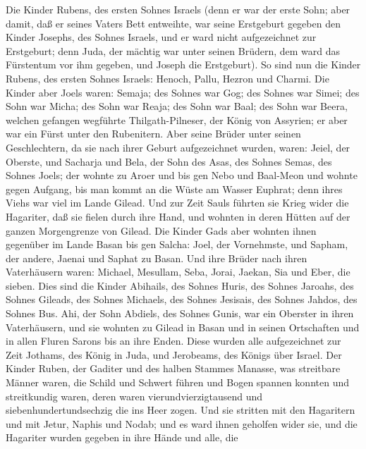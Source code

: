  Die Kinder Rubens, des ersten Sohnes Israels (denn er war
der erste Sohn; aber damit, daß er seines Vaters Bett entweihte, war
seine Erstgeburt gegeben den Kinder Josephs, des Sohnes Israels, und er
ward nicht aufgezeichnet zur Erstgeburt;  denn Juda, der
mächtig war unter seinen Brüdern, dem ward das Fürstentum vor ihm
gegeben, und Joseph die Erstgeburt).  So sind nun die Kinder
Rubens, des ersten Sohnes Israels: Henoch, Pallu, Hezron und Charmi.
 Die Kinder aber Joels waren: Semaja; des Sohnes war Gog;
des Sohnes war Simei;  des Sohn war Micha; des Sohn war
Reaja; des Sohn war Baal;  des Sohn war Beera, welchen
gefangen wegführte Thilgath-Pilneser, der König von Assyrien; er aber
war ein Fürst unter den Rubenitern.  Aber seine Brüder unter
seinen Geschlechtern, da sie nach ihrer Geburt aufgezeichnet wurden,
waren: Jeiel, der Oberste, und Sacharja  und Bela, der Sohn
des Asas, des Sohnes Semas, des Sohnes Joels; der wohnte zu Aroer und
bis gen Nebo und Baal-Meon  und wohnte gegen Aufgang, bis
man kommt an die Wüste am Wasser Euphrat; denn ihres Viehs war viel im
Lande Gilead.  Und zur Zeit Sauls führten sie Krieg wider
die Hagariter, daß sie fielen durch ihre Hand, und wohnten in deren
Hütten auf der ganzen Morgengrenze von Gilead.  Die Kinder
Gads aber wohnten ihnen gegenüber im Lande Basan bis gen Salcha:
 Joel, der Vornehmste, und Sapham, der andere, Jaenai und
Saphat zu Basan.  Und ihre Brüder nach ihren Vaterhäusern
waren: Michael, Mesullam, Seba, Jorai, Jaekan, Sia und Eber, die sieben.
 Dies sind die Kinder Abihails, des Sohnes Huris, des
Sohnes Jaroahs, des Sohnes Gileads, des Sohnes Michaels, des Sohnes
Jesisais, des Sohnes Jahdos, des Sohnes Bus.  Ahi, der Sohn
Abdiels, des Sohnes Gunis, war ein Oberster in ihren Vaterhäusern,
 und sie wohnten zu Gilead in Basan und in seinen
Ortschaften und in allen Fluren Sarons bis an ihre Enden. 
Diese wurden alle aufgezeichnet zur Zeit Jothams, des König in Juda, und
Jerobeams, des Königs über Israel.  Der Kinder Ruben, der
Gaditer und des halben Stammes Manasse, was streitbare Männer waren, die
Schild und Schwert führen und Bogen spannen konnten und streitkundig
waren, deren waren vierundvierzigtausend und siebenhundertundsechzig die
ins Heer zogen.  Und sie stritten mit den Hagaritern und
mit Jetur, Naphis und Nodab;  und es ward ihnen geholfen
wider sie, und die Hagariter wurden gegeben in ihre Hände und alle, die
